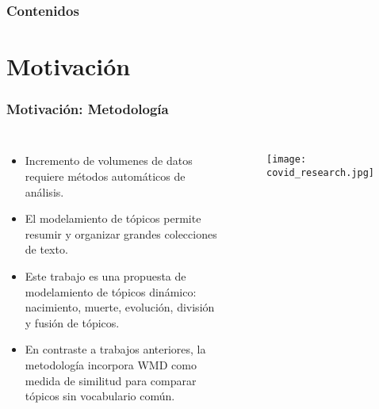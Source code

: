 \documentclass[
	spanish, %
	aspectratio=43, %
	hyperref={pdfencoding=auto,psdextra},
	xcolor={dvipsnames,table,usenames},
]{beamer}
\title[\documentsubtitle]{\documenttitle}
\subtitle{\documentsubject}
\author[\documentauthor]{
	\documentauthor \newline\newline
Profesor guía: Richard Weber \newline
Miembros de la comisión: Ángel Jiménez, Giorgiogiulio Parra
}
\institute[Universidad de Chile]{
	\texttt{[image: \\universitydepartmentimage]} \\
	\medskip
	\universityname \\
	\universityfaculty \\
	\universitydepartment
}
\date[\today]{\footnotesize{\today}}
\begin{document}
\templatePagecfg

\templateFinalcfg

\newcommand\blfootnote[1]{%
  \begingroup
  \renewcommand\thefootnote{}\footnote{#1}%
  \addtocounter{footnote}{-1}%
  \endgroup
}

\begin{frame}
	\titlepage
\end{frame}


\begin{frame}
	\frametitle{Contenidos}
	\tableofcontents
\end{frame}


\section{Motivación}

\begin{frame}[t]
\frametitle{Motivación: Metodología}
  
\begin{columns}
\begin{itemize}
  \item Incremento de volumenes de datos requiere métodos automáticos de análisis.
  \item El modelamiento de tópicos permite resumir y organizar grandes colecciones de texto. %
  \item Este trabajo es una propuesta de modelamiento de tópicos dinámico: nacimiento, muerte, evolución, división y fusión de tópicos.
  \item En contraste a trabajos anteriores, la metodología incorpora WMD como medida de similitud para comparar tópicos sin vocabulario común.
\end{itemize}


\begin{figure}
  \texttt{[image: covid\_research.jpg]} 
 \end{figure}
 \end{columns}
\end{frame}
\end{document}
